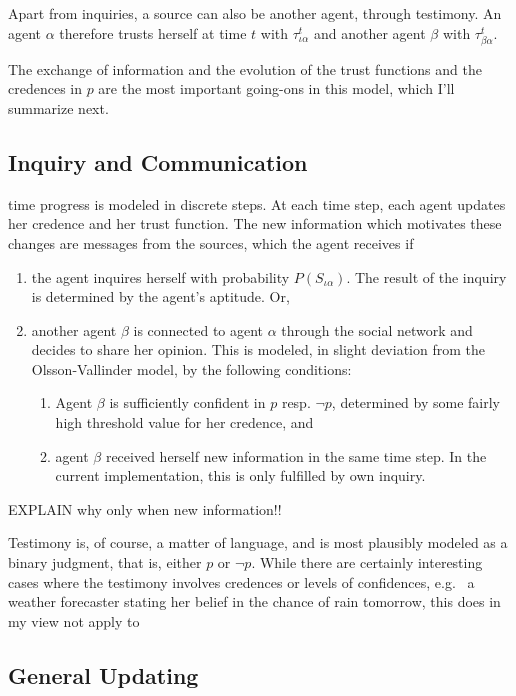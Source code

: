 \documentclass[11pt, a4paper]{article}
\begin{document}
Apart from inquiries, a source can also be another agent, through testimony. An agent $\alpha$ therefore trusts herself at time $t$ with $\tau^t_{\iota\alpha}$ and another agent $\beta$ with $\tau^t_{\beta\alpha}$.

The exchange of information and the evolution of the trust functions and the credences in $p$ are the most important going-ons in this model, which I'll summarize next.

\subsection{Inquiry and Communication} 

time progress is modeled in discrete steps. At each time step, each agent updates her credence and her trust function. The new information which motivates these changes are messages from the sources, which the agent receives if
\begin{enumerate}[label = (\roman*)]
    \item the agent inquires herself with probability $P(S_{\iota\alpha})$. The result of the inquiry is determined by the agent's aptitude. Or,
    \item another agent $\beta$ is connected to agent $\alpha$ through the social network and decides to share her opinion. This is modeled, in slight deviation from the Olsson-Vallinder model, by the following conditions: 
        \begin{enumerate}[label = (\alph*)]
            \item Agent $\beta$ is sufficiently confident in $p$ resp. $\neg p$, determined by some fairly high threshold value for her credence, and
            \item agent $\beta$ received herself new information in the same time step. In the current implementation, this is only fulfilled by own inquiry.  
        \end{enumerate}
\end{enumerate}

EXPLAIN why only when new information!!

Testimony is, of course, a matter of language, and is most plausibly modeled as a binary judgment, that is, either $p$ or $\neg p$. While there are certainly interesting cases where the testimony involves credences or levels of confidences, e.g. \ a weather forecaster stating her belief in the chance of rain tomorrow, this does in my view not apply to  

\subsection{General Updating}
\end{document}
